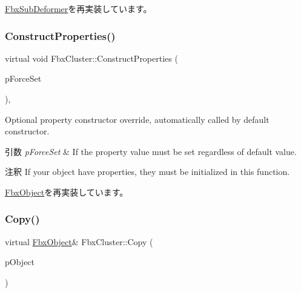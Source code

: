 \hyperlink{class_fbx_sub_deformer_ae3d566383651e82b681827f0f38b97f3}{Fbx\+Sub\+Deformer}を再実装しています。

\mbox{\label{class_fbx_cluster_aaf923a56a7aeb0f224da890e0075dbd1}} 
\subsubsection{\texorpdfstring{Construct\+Properties()}{ConstructProperties()}}
{\footnotesize\ttfamily virtual void Fbx\+Cluster\+::\+Construct\+Properties (\begin{DoxyParamCaption}\item[{bool}]{p\+Force\+Set }\end{DoxyParamCaption})\hspace{0.3cm}{\ttfamily [protected]}, {\ttfamily [virtual]}}

Optional property constructor override, automatically called by default constructor. 
\begin{DoxyParams}{引数}
{\em p\+Force\+Set} & If the property value must be set regardless of default value. \\
\hline
\end{DoxyParams}
\begin{DoxyRemark}{注釈}
If your object have properties, they must be initialized in this function. 
\end{DoxyRemark}


\hyperlink{class_fbx_object_ad44f814323dc1b5e78bff1bfc608b4bb}{Fbx\+Object}を再実装しています。

\mbox{\label{class_fbx_cluster_ac18a0581408958c73f56dd37790c40a9}} 
\subsubsection{\texorpdfstring{Copy()}{Copy()}}
{\footnotesize\ttfamily virtual \hyperlink{class_fbx_object}{Fbx\+Object}\& Fbx\+Cluster\+::\+Copy (\begin{DoxyParamCaption}\item[{const \hyperlink{class_fbx_object}{Fbx\+Object} \&}]{p\+Object }\end{DoxyParamCaption})\hspace{0.3cm}{\ttfamily [virtual]}}

